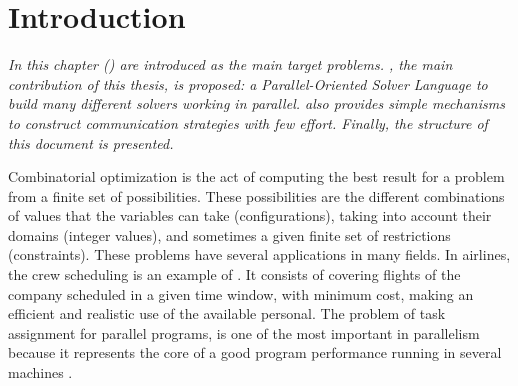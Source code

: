 \chapter{Introduction}
\label{chap:Intro}
\textit{In this chapter \CSPs{} (\csp) are introduced as the main target problems. \posl{}, the main contribution of this thesis, is proposed: a Parallel-Oriented Solver Language to build many different solvers working in parallel. \posl{} also provides simple mechanisms to construct communication strategies with few effort. Finally, the structure of this document is presented.}
\vfill
\minitoc
\newpage

Combinatorial optimization is the act of computing the best result for a problem from a finite set of possibilities. These possibilities are the different combinations of values that the variables can take (configurations), taking into account their domains (integer values), and sometimes a given finite set of restrictions (constraints). These problems have several applications in many fields. In airlines, the crew scheduling is an example of \COP. It consists of covering flights of the company scheduled in a given time window, with minimum cost, making an efficient and realistic use of the available personal. The problem of task assignment for parallel programs, is one of the most important in parallelism because it represents the core of a good program performance running in several machines \cite{Paschos2013}. %

